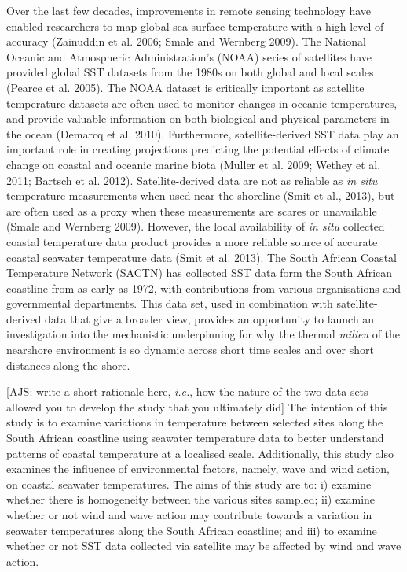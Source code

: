 \documentclass[12pt,A4paper,]{article}
\begin{document}
Over the last few decades, improvements in remote sensing technology
have enabled researchers to map global sea surface temperature with a
high level of accuracy (Zainuddin et al. 2006; Smale and Wernberg 2009).
The National Oceanic and Atmospheric Administration's (NOAA) series of
satellites have provided global SST datasets from the 1980s on both
global and local scales (Pearce et al. 2005). The NOAA dataset is
critically important as satellite temperature datasets are often used to
monitor changes in oceanic temperatures, and provide valuable
information on both biological and physical parameters in the ocean
(Demarcq et al. 2010). Furthermore, satellite-derived SST data play an
important role in creating projections predicting the potential effects
of climate change on coastal and oceanic marine biota (Muller et al.
2009; Wethey et al. 2011; Bartsch et al. 2012). Satellite-derived data
are not as reliable as \emph{in situ} temperature measurements when used
near the shoreline (Smit et al., 2013), but are often used as a proxy
when these measurements are scares or unavailable (Smale and Wernberg
2009). However, the local availability of \emph{in situ} collected
coastal temperature data product provides a more reliable source of
accurate coastal seawater temperature data (Smit et al. 2013). The South
African Coastal Temperature Network (SACTN) has collected SST data form
the South African coastline from as early as 1972, with contributions
from various organisations and governmental departments. This data set,
used in combination with satellite-derived data that give a broader
view, provides an opportunity to launch an investigation into the
mechanistic underpinning for why the thermal \emph{milieu} of the
nearshore environment is so dynamic across short time scales and over
short distances along the shore.

{[}AJS: write a short rationale here, \emph{i.e.}, how the nature of the
two data sets allowed you to develop the study that you ultimately
did{]} The intention of this study is to examine variations in
temperature between selected sites along the South African coastline
using seawater temperature data to better understand patterns of coastal
temperature at a localised scale. Additionally, this study also examines
the influence of environmental factors, namely, wave and wind action, on
coastal seawater temperatures. The aims of this study are to: i) examine
whether there is homogeneity between the various sites sampled; ii)
examine whether or not wind and wave action may contribute towards a
variation in seawater temperatures along the South African coastline;
and iii) to examine whether or not SST data collected via satellite may
be affected by wind and wave action.
\end{document}
